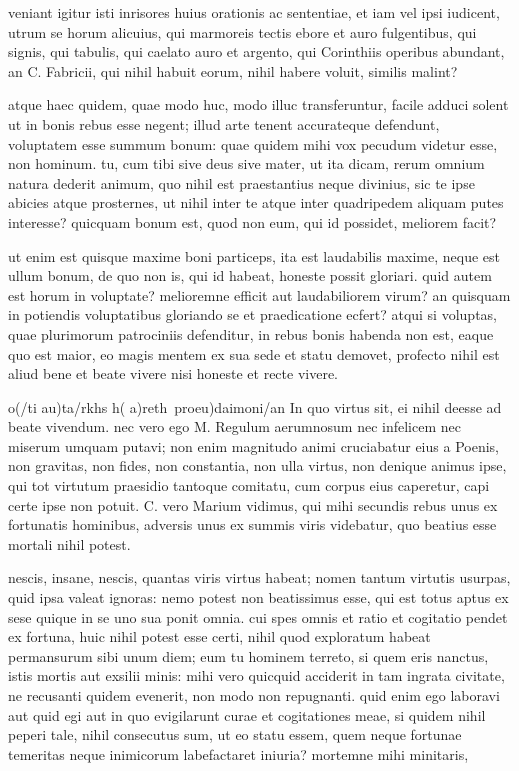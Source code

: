  veniant igitur isti inrisores huius orationis ac sententiae, et iam vel ipsi iudicent, utrum se horum alicuius, qui marmoreis tectis ebore et auro fulgentibus, qui signis, qui tabulis, qui caelato auro et argento, qui Corinthiis operibus abundant, an C. Fabricii, qui nihil habuit eorum, nihil habere voluit, similis malint?

 atque haec quidem, quae modo huc, modo illuc transferuntur, facile adduci solent ut in bonis rebus esse negent; illud arte tenent accurateque defendunt, voluptatem esse summum bonum: quae quidem mihi vox pecudum videtur esse, non hominum. tu, cum tibi sive deus sive mater, ut ita dicam, rerum omnium natura dederit animum, quo nihil est praestantius neque divinius, sic te ipse abicies atque prosternes, ut nihil inter te atque inter quadripedem aliquam putes interesse? quicquam bonum est, quod non eum, qui id possidet, meliorem facit?

 ut enim est quisque maxime boni particeps, ita est laudabilis maxime, neque est ullum bonum, de quo non is, qui id habeat, honeste possit gloriari. quid autem est horum in voluptate? melioremne efficit aut laudabiliorem virum? an quisquam in potiendis voluptatibus gloriando se et praedicatione ecfert? atqui si voluptas, quae plurimorum patrociniis defenditur, in rebus bonis habenda non est, eaque quo est maior, eo magis mentem ex sua sede et statu demovet, profecto nihil est aliud bene et beate vivere nisi honeste et recte vivere.

 o(/ti au)ta/rkhs h( a)reth\ pro\s eu)daimoni/an In quo virtus sit, ei nihil deesse ad beate vivendum. nec vero ego M. Regulum aerumnosum nec infelicem nec miserum umquam putavi; non enim magnitudo animi cruciabatur eius a Poenis, non gravitas, non fides, non constantia, non ulla virtus, non denique animus ipse, qui tot virtutum praesidio tantoque comitatu, cum corpus eius caperetur, capi certe ipse non potuit. C. vero Marium vidimus, qui mihi secundis rebus unus ex fortunatis hominibus, adversis unus ex summis viris videbatur, quo beatius esse mortali nihil potest.

 nescis, insane, nescis, quantas viris virtus habeat; nomen tantum virtutis usurpas, quid ipsa valeat ignoras: nemo potest non beatissimus esse, qui est totus aptus ex sese quique in se uno sua ponit omnia. cui spes omnis et ratio et cogitatio pendet ex fortuna, huic nihil potest esse certi, nihil quod exploratum habeat permansurum sibi unum diem; eum tu hominem terreto, si quem eris nanctus, istis mortis aut exsilii minis: mihi vero quicquid acciderit in tam ingrata civitate, ne recusanti quidem evenerit, non modo non repugnanti. quid enim ego laboravi aut quid egi aut in quo evigilarunt curae et cogitationes meae, si quidem nihil peperi tale, nihil consecutus sum, ut eo statu essem, quem neque fortunae temeritas neque inimicorum labefactaret iniuria? mortemne mihi minitaris,


